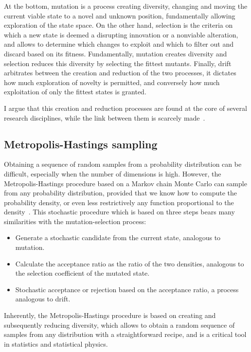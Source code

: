 At the bottom, mutation is a process creating diversity, changing and moving the current viable state to a novel and unknown position, fundamentally allowing exploration of the state space.
On the other hand, selection is the criteria on which a new state is deemed a disrupting innovation or a nonviable alteration, and allows to determine which changes to exploit and which to filter out and discard based on its fitness.
Fundamentally, mutation creates diversity and selection reduces this diversity by selecting the fittest mutants.
Finally, drift arbitrates between the creation and reduction of the two processes, it dictates how much exploration of novelty is permitted, and conversely how much exploitation of only the fittest states is granted.

I argue that this creation and reduction processes are found at the core of several research disciplines, while the link between them is scarcely made~\citep{Baeck1994, Eiben1998}.

\subsection{Metropolis-Hastings sampling}
Obtaining a sequence of random samples from a probability distribution can be difficult, especially when the number of dimensions is high.
However, the Metropolis-Hastings procedure based on a Markov chain Monte Carlo can sample from any probability distribution, provided that we know how to compute the probability density, or even less restrictively any function proportional to the density~\citep{Hastings1970}.
This stochastic procedure which is based on three steps bears many similarities with the mutation-selection process:
\begin{itemize}
    \item Generate a stochastic candidate from the current state, analogous to mutation.
    \item Calculate the acceptance ratio as the ratio of the two densities, analogous to the selection coefficient of the mutated state.
    \item Stochastic acceptance or rejection based on the acceptance ratio, a process analogous to drift.
\end{itemize}
Inherently, the Metropolis-Hastings procedure is based on creating and subsequently reducing diversity, which allows to obtain a random sequence of samples from any distribution with a straightforward recipe, and is a critical
tool in statistics and statistical physics.

